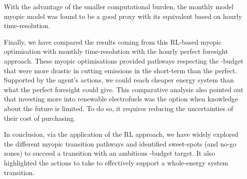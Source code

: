 With the advantage of the smaller computational burden, the monthly model myopic model was found to be a good proxy with its equivalent based on hourly time-resolution.

Finally, we have compared the results coming from this \gls{RL}-based myopic optimisation with monthly time-resolution with the hourly perfect foresight approach. These myopic optimisations provided pathways respecting the -budget that were more drastic in cutting emissions in the short-term than the perfect. Supported by the agent's actions, we could reach cheaper energy system than what the perfect foresight could give. This comparative analysis also pointed out that investing more into renewable electrofuels was the option when knowledge about the future is limited. To do so, it requires reducing the uncertainties of their cost of purchasing. 

In conclusion, via the application of the \gls{RL} approach, we have widely explored the different myopic transition pathways and identified sweet-spots (and no-go zones) to succeed a transition with an ambitious -budget target. It also highlighted the actions to take to effectively support a whole-energy system transition.
